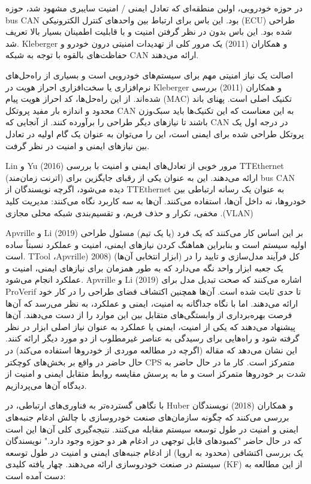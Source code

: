 \documentclass[a4paper,10pt]{article}
\begin{document}
        در حوزه خودرویی، اولین منطقه‌ای که تعادل ایمنی / امنیت سایبری مشهود شد، حوزه bus CAN بود. این باس برای ارتباط بین واحدهای کنترل الکترونیکی (ECU) طراحی شده بود. این باس بدون در نظر گرفتن امنیت و با قابلیت اطمینان بسیار بالا تعریف شد. Kleberger و همکاران (2011) یک مرور کلی از تهدیدات امنیتی درون خودرو و حفاظت‌های بالقوه با توجه به شبکه CAN ارائه می‌دهند.

        اصالت یک نیاز امنیتی مهم برای سیستم‌های خودرویی است و بسیاری از راه‌حل‌های نرم‌افزاری یا سخت‌افزاری احراز هویت در Kleberger و همکاران (2011) بررسی شده‌اند. از این راه‌حل‌ها، کد احراز هویت پیام (MAC) تکنیک اصلی است. پهنای باند محدود و اندازه بار مفید پروتکل CAN به این معناست که این تکنیک‌ها باید سبک‌وزن باشند تا نیازهای دیگر طراحی را برآورده کنند. از آنجایی که CAN در درجه اول یک پروتکل طراحی شده برای ایمنی است، این را می‌توان به عنوان یک گام اولیه در تعادل بین نیازهای ایمنی و امنیت در نظر گرفت.
        
        Lin و Yu (2016) مرور خوبی از تعادل‌های ایمنی و امنیت با بررسی TTEthernet (اترنت زمان‌مند) ارائه می‌دهند. این به عنوان یکی از رقبای جایگزین برای bus CAN دیده می‌شود، اگرچه نویسندگان از TTEthernet به عنوان یک رسانه ارتباطی بین خودروها، نه داخل آن‌ها، استفاده می‌کنند. آن‌ها به سه کاربرد نگاه می‌کنند: مدیریت کلید مخفی، تکرار و حذف فریم، و تقسیم‌بندی شبکه محلی مجازی .(VLAN)
        
        Apvrille و Li (2019) بر این اساس کار می‌کنند که یک فرد (یا یک تیم) مسئول طراحی اولیه سیستم است و بنابراین هماهنگ کردن نیازهای ایمنی، امنیت و عملکرد نسبتاً ساده است. TTool ،Apvrille) 2008) (ابزار انتخابی آن‌ها) کل فرآیند مدل‌سازی و تایید را در یک جعبه ابزار واحد نگه می‌دارد که به طور همزمان برای نیازهای ایمنی، امنیت و عملکرد انجام می‌شود. Apvrille و Li (2019) اشاره می‌کنند که صحت تبدیل مدل برای ProVerif تا حدی ثابت شده است. آن‌ها همچنین اکتشاف فضای طراحی را در کار خود ارائه می‌دهند. اما با نگاه جداگانه به امنیت، ایمنی و عملکرد، به نظر می‌رسد که آن‌ها فرصت بهره‌برداری از وابستگی‌های متقابل بین این موارد را از دست می‌دهند. آن‌ها پیشنهاد می‌دهند که یکی از امنیت، ایمنی یا عملکرد به عنوان نیاز اصلی ابزار در نظر گرفته شود و راه‌هایی برای رسیدگی به عناصر غیرمطلوب از دو مورد دیگر ارائه کنند. این نشان می‌دهد که مقاله (اگرچه در مطالعه موردی از خودروها استفاده می‌کند) در حال حاضر در واقع بر بخش‌های کوچکتر CPS متمرکز است. کار ما در حال حاضر به شدت بر خودروها متمرکز است و ما به پرسش مقایسه روابط متقابل ایمنی و امنیت از دیدگاه آن‌ها می‌پردازیم.

        با نگاهی گسترده‌تر به فناوری‌های ارتباطی، در Huber و همکاران (2018) نویسندگان بررسی می‌کنند که چگونه سازمان‌های صنعت خودروسازی با چالش ادغام جنبه‌های ایمنی و امنیت در طول توسعه سیستم مقابله می‌کنند. نتیجه‌گیری کلی آن‌ها این است که در حال حاضر "کمبودهای قابل توجهی در ادغام هر دو حوزه وجود دارد." نویسندگان یک بررسی اکتشافی (محدود به اروپا) از ادغام جنبه‌های ایمنی و امنیت در طول توسعه سیستم در صنعت خودروسازی ارائه می‌دهند. چهار یافته کلیدی (KF) از این مطالعه به دست آمده است:
\end{document}
